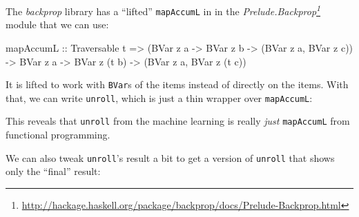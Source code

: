 \documentclass[]{article}
\newenvironment{Shaded}{}{}
\newcommand{\CommentTok}[1]{\textcolor[rgb]{0.38,0.63,0.69}{\textit{#1}}}
\newcommand{\DataTypeTok}[1]{\textcolor[rgb]{0.56,0.13,0.00}{#1}}
\newcommand{\FunctionTok}[1]{\textcolor[rgb]{0.02,0.16,0.49}{#1}}
\newcommand{\KeywordTok}[1]{\textcolor[rgb]{0.00,0.44,0.13}{\textbf{#1}}}
\newcommand{\NormalTok}[1]{#1}
\newcommand{\OtherTok}[1]{\textcolor[rgb]{0.00,0.44,0.13}{#1}}
\renewcommand{\href}[2]{#2\footnote{\url{#1}}}
\begin{document}
The \emph{backprop} library has a ``lifted'' \texttt{mapAccumL} in in the
\emph{\href{http://hackage.haskell.org/package/backprop/docs/Prelude-Backprop.html}{Prelude.Backprop}}
module that we can use:

\begin{Shaded}
\begin{Highlighting}[]
\NormalTok{mapAccumL}
\OtherTok{    ::} \DataTypeTok{Traversable}\NormalTok{ t}
    \OtherTok{=>}\NormalTok{ (}\DataTypeTok{BVar}\NormalTok{ z a }\OtherTok{->} \DataTypeTok{BVar}\NormalTok{ z b }\OtherTok{->}\NormalTok{ (}\DataTypeTok{BVar}\NormalTok{ z a, }\DataTypeTok{BVar}\NormalTok{ z c))}
    \OtherTok{->} \DataTypeTok{BVar}\NormalTok{ z a}
    \OtherTok{->} \DataTypeTok{BVar}\NormalTok{ z (t b)}
    \OtherTok{->}\NormalTok{ (}\DataTypeTok{BVar}\NormalTok{ z a, }\DataTypeTok{BVar}\NormalTok{ z (t c))}
\end{Highlighting}
\end{Shaded}

It is lifted to work with \texttt{BVar}s of the items instead of directly on the
items. With that, we can write \texttt{unroll}, which is just a thin wrapper
over \texttt{mapAccumL}:

\begin{Shaded}
\end{Shaded}

This reveals that \texttt{unroll} from the machine learning is really
\emph{just} \texttt{mapAccumL} from functional programming.

We can also tweak \texttt{unroll}'s result a bit to get a version of
\texttt{unroll} that shows only the ``final'' result:
\end{document}
